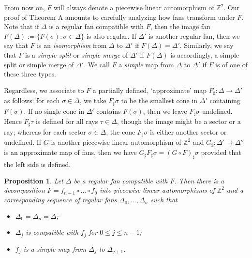 \documentclass[11pt]{amsart}
\theoremstyle{definition}
\theoremstyle{plain}
\newtheorem{prop}[thm]{Proposition}
\theoremstyle{remark}
\numberwithin{equation}{section}
\def\Z{\mathbb{Z}}
\def\fan{\Delta}
\begin{document}
From now on, $F$ will always denote a piecewise linear automorphism of $\Z^2$.  Our proof of Theorem A amounts to carefully analyzing how fans transform under $F$.  Note that if $\Delta$ is a  regular fan compatible with $F$, then the image fan $F(\Delta) :=\{F(\sigma):\sigma\in \Delta\}$ is also regular.  If $\Delta'$ is another regular fan, then we say that $F$ is an {\em isomorphism} from $\Delta$ to $\Delta'$ if $F(\Delta) = \Delta'$.  Similarly, we say that $F$ is a {\em simple split} or {\em simple merge} of $\fan'$ if $F(\Delta)$ is accordingly, a simple split or simple merge of $\Delta'$.  We call $F$ a {\em simple} map from $\Delta$ to $\Delta'$ if $F$ is of one of these three types.

Regardless, we associate to $F$ a partially defined, `approximate' map $F_\sharp:\Delta\to\Delta'$ as follows: for each $\sigma\in\fan$, we take $F_\sharp\sigma$ to be the smallest cone in $\fan'$ containing $F(\sigma)$.  If no single cone in $\fan'$ contains $F(\sigma)$, then we leave $F_\sharp\sigma$ undefined.  Hence $F_\sharp\tau$ is defined for all rays $\tau\in\fan$, though the image might be a sector or a ray; whereas for each sector $\sigma\in\Delta$, the cone $F_\sharp \sigma$ is either another sector or undefined. If $G$ is another piecewise linear automorphism of $\Z^2$ and $G_\sharp:\fan'\to\fan''$ is an approximate map of fans, then we have $G_\sharp F_\sharp \sigma = (G\circ F)_\sharp\sigma$ provided that the left side is defined.

\begin{prop}
\label{prop:decomposition}
Let $\fan$ be a regular fan compatible with $F$.  Then there is a decomposition $F=f_{n-1}\circ\dots \circ f_0$ into piecewise linear automorphisms of $\Z^2$ and a corresponding sequence of  regular fans $\Delta_0,\dots,\Delta_n$ such that
\begin{itemize}
 \item $\Delta_0 = \Delta_n = \Delta$;
 \item $\Delta_j$ is compatible with $f_j$ for $0\leq j\leq n-1$;
 \item $f_j$ is a simple map from $\Delta_j$ to $\Delta_{j+1}$.
\end{itemize}
\end{prop}
\end{document}
